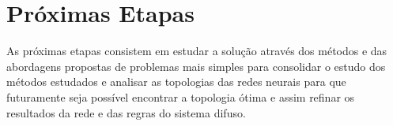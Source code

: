 \chapter{Próximas Etapas}

As próximas etapas consistem em estudar a solução através dos métodos e das abordagens 
propostas de problemas mais simples para consolidar o estudo dos métodos estudados e 
analisar as topologias das redes neurais para que futuramente seja possível encontrar 
a topologia ótima e assim refinar os resultados da rede e das regras do sistema difuso.

